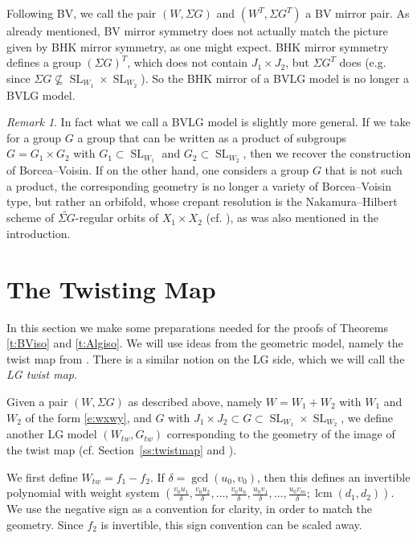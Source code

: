 \documentclass[10pt, letterpaper]{amsart}
\theoremstyle{remark}
\newtheorem{rem}{Remark}[thm]
\newcommand{\tw}[1]{{#1}_{tw}}
\newcommand{\s}[1]{\Sigma #1}
\DeclareMathOperator{\SL}{SL}
\DeclareMathOperator{\lcm}{lcm}
\begin{document}
Following BV, we call the pair $(W,\s{G})$ and $(W^T,\s{G^T})$ a BV mirror pair. %
As already mentioned, BV mirror symmetry does not actually match the picture given by BHK mirror symmetry, as one might expect. 
BHK mirror symmetry defines a group $(\s{G})^T$, which does not contain $J_1\times J_2$, but $\s G^T$ does (e.g. since $\s{G}\nsubseteq \SL_{W_1}\times \SL_{W_2}$). So the BHK mirror of a BVLG model is no longer a BVLG model.


\begin{rem}
In fact what we call a BVLG model is slightly more general. If we take for a group $G$ a group that can be written as a product of subgroups $G=G_1\times G_2$ with $G_1\subset \SL_{W_1}$ and $ G_2\subset \SL_{W_2}$, then we recover the construction of Borcea--Voisin. If on the other hand, one considers a group $G$ that is not such a product, the corresponding geometry is no longer a variety of Borcea--Voisin type, but rather an orbifold, whose crepant resolution is the Nakamura--Hilbert scheme of $\widetilde{\s G}$-regular orbits of $X_1\times X_2$ (cf. \cite{Na}), as was also mentioned in the introduction.  
\end{rem}







\section{The Twisting Map}\label{sec:twist}
In this section we make some preparations needed for the proofs of Theorems \ref{t:BViso} and \ref{t:Algiso}. We will use ideas from the geometric model, namely the twist map from \cite{Borcea}. There is a similar notion on the LG side, which we will call the \emph{LG twist map}. 

Given a pair $(W,\s{G})$ as described above, namely $W=W_1+W_2$ with $W_1$ and $W_2$ of the form \eqref{e:wxwy}, and $G$ with $J_1\times J_2\subset G\subset \SL_{W_1}\times \SL_{W_2}$, we define another LG model $(\tw{W}, \tw{G})$ corresponding to the geometry of the image of the twist map (cf. Section~\ref{ss:twistmap} and \cite{ABS}).

We first define $\tw{W}=f_1-f_2$. If $\delta=\gcd(u_0,v_0)$, then this defines an invertible polynomial with weight system $(\tfrac{v_0u_1}{\delta},\tfrac{v_0u_2}{\delta},\dots,\tfrac{v_0u_n}{\delta},\tfrac{u_0v_1}{\delta},\dots,\tfrac{u_0v_m}{\delta};\lcm(d_1,d_2))$. We use the negative sign as a convention for clarity, in order to match the geometry. Since $f_2$ is invertible, this sign convention can be scaled away. 
\end{document}
